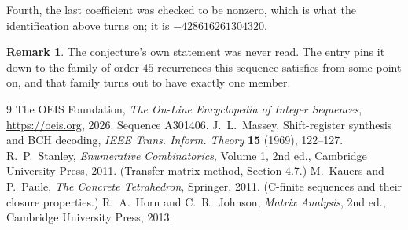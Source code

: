\documentclass[11pt,a4paper]{article}
\theoremstyle{plain}
\theoremstyle{definition}
\newtheorem{remark}[theorem]{Remark}
\begin{document}
Fourth, the last coefficient was checked to be nonzero, which is what the identification above
turns on; it is $-428616261304320$.

\begin{remark}
The conjecture's own statement was never read. The entry pins it down to the family of
order-$45$ recurrences this sequence satisfies from some point on, and that family turns
out to have exactly one member.
\end{remark}

\begin{thebibliography}{9}
 The OEIS Foundation, \emph{The On-Line Encyclopedia of Integer
Sequences}, \url{https://oeis.org}, 2026. Sequence A301406.
 J.~L.~Massey, Shift-register synthesis and BCH decoding, \emph{IEEE
Trans. Inform. Theory} \textbf{15} (1969), 122--127.
 R.~P.~Stanley, \emph{Enumerative Combinatorics}, Volume 1, 2nd ed.,
Cambridge University Press, 2011. (Transfer-matrix method, Section 4.7.)
 M.~Kauers and P.~Paule, \emph{The Concrete Tetrahedron}, Springer, 2011.
(C-finite sequences and their closure properties.)
 R.~A.~Horn and C.~R.~Johnson, \emph{Matrix Analysis}, 2nd ed., Cambridge
University Press, 2013.
\end{thebibliography}
\end{document}
